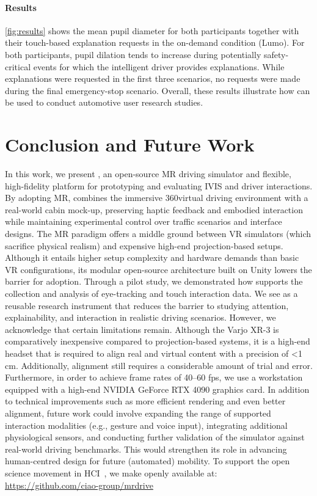 \documentclass[sigconf, screen]{acmart}
\begin{document}
\paragraph{\textbf{Results}}


\autoref{fig:results} shows the mean pupil diameter for both participants together with their touch-based explanation requests in the on-demand condition (Lumo). For both participants, pupil dilation tends to increase during potentially safety-critical events for which the intelligent driver provides explanations. While explanations were requested in the first three scenarios, no requests were made during the final emergency-stop scenario. Overall, these results illustrate how \name can be used to conduct automotive user research studies.



\section{Conclusion and Future Work}


In this work, we present \name, an open-source \gls{MR} driving simulator and flexible, high-fidelity platform for prototyping and evaluating \gls{IVIS} and driver interactions. By adopting \gls{MR}, \name combines the immersive 360\degree virtual driving environment with a real-world cabin mock-up, preserving haptic feedback and embodied interaction while maintaining experimental control over traffic scenarios and interface designs.
%
The \gls{MR} paradigm offers a middle ground between \gls{VR} simulators (which sacrifice physical realism) and expensive high-end projection-based setups. Although it entails higher setup complexity and hardware demands than basic \gls{VR} configurations, its modular open-source architecture built on Unity lowers the barrier for adoption.
%
Through a pilot study, we demonstrated how \name supports the collection and analysis of eye-tracking and touch interaction data. We see \name as a reusable research instrument that reduces the barrier to studying attention, explainability, and interaction in realistic driving scenarios. 
%
However, we acknowledge that certain limitations remain. Although the Varjo XR-3 is comparatively inexpensive compared to projection-based systems, it is a high-end headset that is required to align real and virtual content with a precision of <1\,cm. Additionally, alignment still requires a considerable amount of trial and error. Furthermore, in order to achieve frame rates of 40–60 fps, we use a workstation equipped with a high-end NVIDIA GeForce RTX 4090 graphics card. 
%
In addition to technical improvements such as more efficient rendering and even better alignment, future work could involve expanding the range of supported interaction modalities (e.g., gesture and voice input), integrating additional physiological sensors, and conducting further validation of the simulator against real-world driving benchmarks. This would strengthen its role in advancing human-centred design for future (automated) mobility. To support the open science movement in HCI~\cite{salehzadeh_niksirat_changes_2023, ebel_changing_2024}, we make \name openly available at: \url{https://github.com/ciao-group/mrdrive} 




\end{document}
